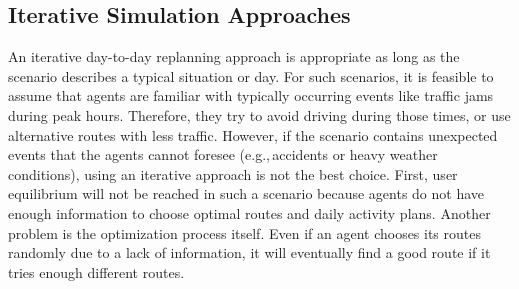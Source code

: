 \subsection{Iterative Simulation Approaches} 
\label{sec:IterativeSimulationApproaches}

An iterative day-to-day replanning approach is appropriate as long as the scenario describes a typical situation or day. For such scenarios, it is feasible to assume that agents are familiar with typically occurring events like traffic jams during peak hours. Therefore, they try to avoid driving during those times, or use alternative routes with less traffic. However, if the scenario contains unexpected events that the agents cannot foresee (e.g.,\,accidents or heavy weather conditions), using an iterative approach is not the best choice. First, user equilibrium will not be reached in such a scenario because agents do not have enough information to choose optimal routes and daily activity plans. Another problem is the optimization process itself. Even if an agent chooses its routes randomly due to a lack of information, it will eventually find a good route if it tries enough different routes.

